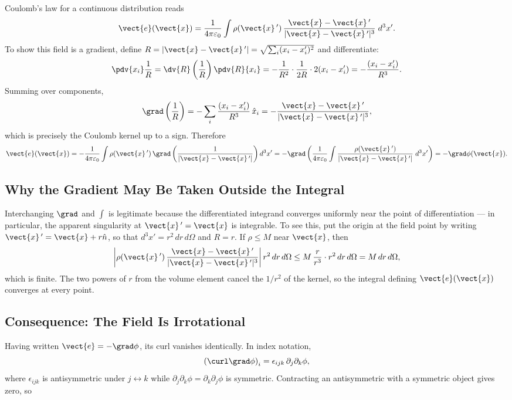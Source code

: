 Coulomb's law for a continuous distribution reads
\[
    \vect{e}(\vect{x}) = \frac{1}{4\pi\varepsilon_0}\int \rho(\vect{x}\,')\,\frac{\vect{x}-\vect{x}\,'}{|\vect{x}-\vect{x}\,'|^3}\; d^3x'.
\]
To show this field is a gradient, define $R = |\vect{x}-\vect{x}\,'| = \sqrt{\sum_i (x_i - x_i')^2}$ and differentiate:
\[
    \pdv{x_i}\frac{1}{R} = \dv{R}\left(\frac{1}{R}\right)\pdv{R}{x_i} = -\frac{1}{R^2}\cdot\frac{1}{2R}\cdot 2(x_i - x_i') = -\frac{(x_i - x_i')}{R^3}.
\]
Summing over components,
\[
    \grad\left(\frac{1}{R}\right) = -\sum_i \frac{(x_i - x_i')}{R^3}\,\hat{x}_i = -\frac{\vect{x}-\vect{x}\,'}{|\vect{x}-\vect{x}\,'|^3},
\]
which is precisely the Coulomb kernel up to a sign. Therefore
\[
    \vect{e}(\vect{x}) = -\frac{1}{4\pi\varepsilon_0}\int \rho(\vect{x}\,')\,\grad\left(\frac{1}{|\vect{x}-\vect{x}\,'|}\right) d^3x'
    = -\grad\left(\frac{1}{4\pi\varepsilon_0}\int \frac{\rho(\vect{x}\,')}{|\vect{x}-\vect{x}\,'|}\; d^3x'\right) = -\grad\phi(\vect{x}).
\]

\subsection{Why the Gradient May Be Taken Outside the Integral}

Interchanging $\grad$ and $\int$ is legitimate because the differentiated integrand converges uniformly near the point of differentiation --- in particular, the apparent singularity at $\vect{x}\,' = \vect{x}$ is integrable. To see this, put the origin at the field point by writing $\vect{x}\,' = \vect{x} + r\hat{n}$, so that $d^3x' = r^2\,dr\,d\Omega$ and $R = r$. If $\rho \le M$ near $\vect{x}$, then
\[
    \left|\rho(\vect{x}\,')\,\frac{\vect{x}-\vect{x}\,'}{|\vect{x}-\vect{x}\,'|^3}\right| r^2\,dr\,d\Omega \le M\,\frac{r}{r^3}\cdot r^2\,dr\,d\Omega = M\,dr\,d\Omega,
\]
which is finite. The two powers of $r$ from the volume element cancel the $1/r^2$ of the kernel, so the integral defining $\vect{e}(\vect{x})$ converges at every point.

\subsection{Consequence: The Field Is Irrotational}

Having written $\vect{e} = -\grad\phi$, its curl vanishes identically. In index notation,
\[
    \left(\curl\grad\phi\right)_i = \epsilon_{ijk}\,\partial_j\partial_k\phi,
\]
where $\epsilon_{ijk}$ is antisymmetric under $j \leftrightarrow k$ while $\partial_j\partial_k\phi = \partial_k\partial_j\phi$ is symmetric. Contracting an antisymmetric with a symmetric object gives zero, so

